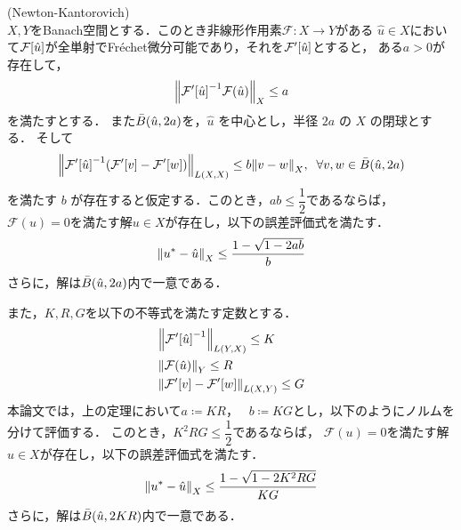 \begin{定理} (Newton-Kantorovich)\\
  \(X,Y\)をBanach空間とする．このとき非線形作用素\(\mathcal{F}\colon X\rightarrow Y \)がある
  \(\hat{u}\in X\)において\(\mathcal{F}\qty[\hat{u}]\)が全単射でFr\'{e}chet微分可能であり，それを\(\mathcal{F}'\qty[\hat{u}]\)とすると，
  ある\(a > 0\)が存在して，
  \begin{align}
    \norm{\mathcal{F}'\qty[\hat{u}]^{-1} \mathcal{F}\qty(\hat{u})}_X \leq a
  \end{align}
  を満たすとする．
  また\(\bar{B}\qty(\hat{u},2a)\)を，\(\hat{u}\) を中心とし，半径 \(2a\) の \(X\) の閉球とする．
  そして
  \begin{align}
    \norm{\mathcal{F}'\qty[\hat{u}]^{-1} \qty(\mathcal{F}'\qty[v]-\mathcal{F}'\qty[w])}_{L(X , X)}
    \leq
    b\norm{v-w}_X,\;\;\forall v,w \in \bar{B}\qty(\hat{u}, 2a)
  \end{align}
  を満たす \(b\) が存在すると仮定する．このとき，\(ab \leq \dfrac{1}{2}\)であるならば，
  \(\mathcal{F}(u) =0 \)を満たす解\(u \in X\)が存在し，以下の誤差評価式を満たす．
  \begin{align}
    \norm{u^*-\hat{u}}_X \leq \dfrac{1-\sqrt{1-2ab}}{b}
  \end{align}
  さらに，解は\(\bar{B}\qty(\hat{u},2a)\)内で一意である．
\end{定理}
また，\(K,R,G\)を以下の不等式を満たす定数とする．
\begin{align}
    &\norm{\mathcal{F}'\qty[\hat{u}]^{-1}}_{L(Y,X)} \leq K\\
    &\norm{\mathcal{F}\qty(\hat{u})}_{Y} \leq R\\
    &\norm{\mathcal{F}'\qty[v]-\mathcal{F}'\qty[w]}_{L(X , Y)} \leq G
\end{align}
本論文では，上の定理において\(a\coloneqq KR，\;\;\;b\coloneqq KG\)とし，以下のようにノルムを分けて評価する．
このとき，\(K^2RG \leq \dfrac{1}{2}\)であるならば，
  \(\mathcal{F}(u) =0 \)を満たす解\(u \in X\)が存在し，以下の誤差評価式を満たす．
  \begin{align}
    \norm{u^*-\hat{u}}_X \leq \dfrac{1-\sqrt{1-2K^2RG}}{KG}
  \end{align}
  さらに，解は\(\bar{B}\qty(\hat{u},2KR)\)内で一意である．
